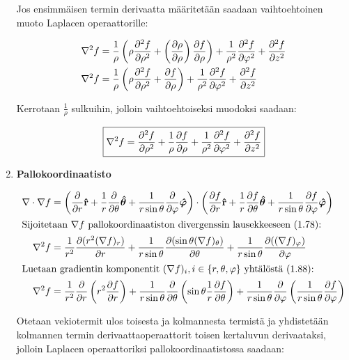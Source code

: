 \documentclass[../johdoksia.tex]{subfiles}
\begin{document}
\begin{enumerate}
		Jos ensimmäisen termin derivaatta määritetään saadaan vaihtoehtoinen muoto Laplacen operaattorille:
		
		\begin{align}
			\nabla^2 f &= \frac{1}{\rho}\left(\rho\pdv{^2f}{\rho^2} + \left(\pdv{\rho}{\rho}\right)\pdv{f}{\rho}\right) + \frac{1}{\rho^2}\pdv{^2f}{\varphi^2} + \pdv{^2f}{z^2} \\
			\nabla^2 f &= \frac{1}{\rho}\left(\rho\pdv{^2f}{\rho^2} + \pdv{f}{\rho}\right) + \frac{1}{\rho^2}\pdv{^2f}{\varphi^2} + \pdv{^2f}{z^2}
		\end{align}
		
		\noindent Kerrotaan $\frac{1}{\rho}$ sulkuihin, jolloin vaihtoehtoiseksi muodoksi saadaan:
		
		\begin{equation}
			\boxed{\nabla^2 f = \pdv{^2f}{\rho^2} + \frac{1}{\rho}\pdv{f}{\rho} + \frac{1}{\rho^2}\pdv{^2f}{\varphi^2} + \pdv{^2f}{z^2}}
		\end{equation}
		
		\item \textbf{Pallokoordinaatisto}
		
		\begin{align}
			\nabla\cdot\nabla f &= \left(\pdv{}{r}\mathbf{\hat{r}} + \frac{1}{r}\pdv{}{\theta}\boldsymbol{\hat{\theta}} + \frac{1}{r\sin\theta}\pdv{}{\varphi}\boldsymbol{\hat{\varphi}}\right)\cdot\left(\pdv{f}{r}\mathbf{\hat{r}} + \frac{1}{r}\pdv{f}{\theta}\boldsymbol{\hat{\theta}} + \frac{1}{r\sin\theta}\pdv{f}{\varphi}\boldsymbol{\hat{\varphi}}\right) \\
			\intertext{Sijoitetaan $\nabla f$ pallokoordinaatiston divergenssin lausekkeeseen (1.78):}
			\nabla^2 f &= \frac{1}{r^2}\pdv{(r^2(\nabla f)_r)}{r} + \frac{1}{r\sin\theta}\pdv{(\sin\theta(\nabla f)_\theta)}{\theta} + \frac{1}{r\sin\theta}\pdv{((\nabla f)_\varphi)}{\varphi} \\
			\intertext{Luetaan gradientin komponentit $(\nabla f)_i, i\in\{r, \theta, \varphi\}$ yhtälöstä (1.88):}
			\nabla^2 f &= \frac{1}{r^2}\pdv{}{r}\left(r^2\pdv{f}{r}\right) + \frac{1}{r\sin\theta}\pdv{}{\theta}\left(\sin\theta\frac{1}{r}\pdv{f}{\theta}\right) + \frac{1}{r\sin\theta}\pdv{}{\varphi}\left(\frac{1}{r\sin\theta}\pdv{f}{\varphi}\right)
		\end{align}
		
		\noindent Otetaan vekiotermit ulos toisesta ja kolmannesta termistä ja yhdistetään kolmannen termin derivaattaoperaattorit toisen kertaluvun derivaataksi, jolloin Laplacen operaattoriksi pallokoordinaatistossa saadaan:
		

\end{enumerate}
\end{document}
